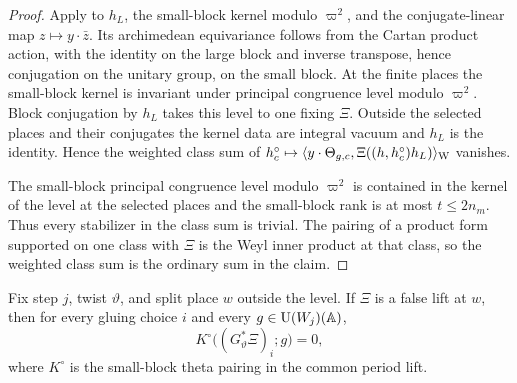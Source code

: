 \begin{proof}
Apply  to $h_L$, the small-block kernel modulo $\varpi^2$, and the conjugate-linear map $z\mapsto y\cdot\bar z$. Its archimedean equivariance follows from the Cartan product action, with the identity on the large block and inverse transpose, hence conjugation on the unitary group, on the small block. At the finite places the small-block kernel is invariant under principal congruence level modulo $\varpi^2$. Block conjugation by $h_L$ takes this level to one fixing $\Xi$. Outside the selected places and their conjugates the kernel data are integral vacuum and $h_L$ is the identity. Hence the weighted class sum of $h_c^\circ\mapsto\langle y\cdot\Theta_{g,c},\Xi((h,h_c^\circ)h_L)\rangle_{\rm W}$ vanishes.

The small-block principal congruence level modulo $\varpi^2$ is contained in the kernel of the level at the selected places and the small-block rank is at most $t\le2n_m$. Thus every stabilizer in the class sum is trivial. The pairing of a product form supported on one class with $\Xi$ is the Weyl inner product at that class, so the weighted class sum is the ordinary sum in the claim.
\end{proof}

\begin{lemma}
\label{lem:c-false-theta-pairing}
\emitthmsource
Fix step $j$, twist $\vartheta$, and split place $w$ outside the level. If $\Xi$ is a false lift at $w$, then for every gluing choice $i$ and every $g\in \operatorname{U}(W_j)(\mathbb A)$,
\[
 K^\circ\bigl((G_\vartheta^*\Xi)_i;g\bigr)=0 ,
\]
where $K^\circ$ is the small-block theta pairing in the common period lift.
\end{lemma}

